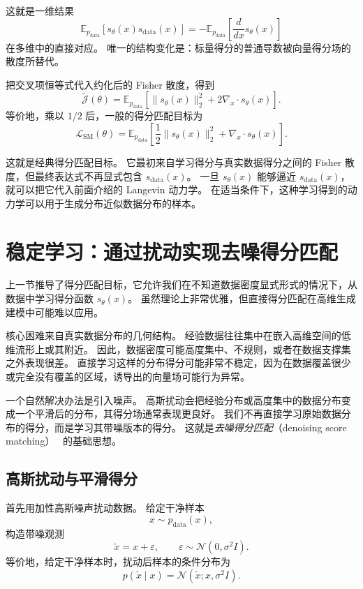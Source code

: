 这就是一维结果
\[
\mathbb{E}_{p_{\text{data}}}
\left[
s_\theta(x)s_{\text{data}}(x)
\right]
=
-
\mathbb{E}_{p_{\text{data}}}
\left[
\frac{d}{dx}s_\theta(x)
\right]
\]
在多维中的直接对应。
唯一的结构变化是：标量得分的普通导数被向量得分场的散度所替代。

把交叉项恒等式代入约化后的 Fisher 散度，得到
\[
\tilde{\mathcal{J}}(\theta)
=
\mathbb{E}_{p_{\text{data}}}
\left[
\|s_\theta(x)\|_2^2
+
2\nabla_x\cdot s_\theta(x)
\right].
\]
等价地，乘以 $1/2$ 后，一般的得分匹配目标为
\[
\boxed{
\mathcal{L}_{\text{SM}}(\theta)
=
\mathbb{E}_{p_{\text{data}}}
\left[
\frac{1}{2}
\|s_\theta(x)\|_2^2
+
\nabla_x\cdot s_\theta(x)
\right].
}
\]

这就是经典得分匹配目标。
它最初来自学习得分与真实数据得分之间的 Fisher 散度，但最终表达式不再显式包含 $s_{\text{data}}(x)$。
一旦 $s_\theta(x)$ 能够逼近 $s_{\text{data}}(x)$，就可以把它代入前面介绍的 Langevin 动力学。
在适当条件下，这种学习得到的动力学可以用于生成分布近似数据分布的样本。

\section{稳定学习：通过扰动实现去噪得分匹配}

上一节推导了得分匹配目标，它允许我们在不知道数据密度显式形式的情况下，从数据中学习得分函数 $s_\theta(x)$。
虽然理论上非常优雅，但直接得分匹配在高维生成建模中可能难以应用。

核心困难来自真实数据分布的几何结构。
经验数据往往集中在嵌入高维空间的低维流形上或其附近。
因此，数据密度可能高度集中、不规则，或者在数据支撑集之外表现很差。
直接学习这样的分布得分可能非常不稳定，因为在数据覆盖很少或完全没有覆盖的区域，诱导出的向量场可能行为异常。

一个自然解决办法是引入噪声。
高斯扰动会把经验分布或高度集中的数据分布变成一个平滑后的分布，其得分场通常表现更良好。
我们不再直接学习原始数据分布的得分，而是学习其带噪版本的得分。
这就是\emph{去噪得分匹配}（denoising score matching）~\cite{vincent2011connection} 的基础思想。

\subsection{高斯扰动与平滑得分}

首先用加性高斯噪声扰动数据。
给定干净样本
\[
x\sim p_{\text{data}}(x),
\]
构造带噪观测
\[
\tilde{x}
=
x+\varepsilon,
\qquad
\varepsilon\sim\mathcal{N}(0,\sigma^2 I).
\]
等价地，给定干净样本时，扰动后样本的条件分布为
\[
p(\tilde{x}\mid x)
=
\mathcal{N}(\tilde{x};x,\sigma^2 I).
\]

